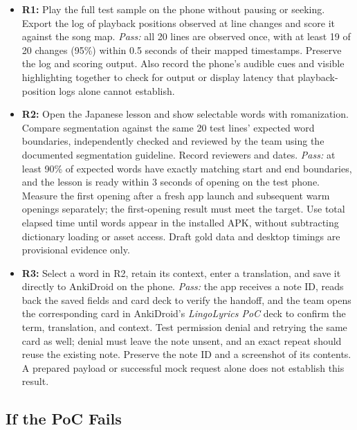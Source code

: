 \documentclass{article}
\begin{document}
\begin{itemize}
    \item \textbf{R1:} Play the full test sample on the phone without pausing
    or seeking. Export the log of playback positions observed at line changes
    and score it against the song map. \emph{Pass:} all 20 lines are observed
    once, with at least 19 of 20 changes (95\%) within 0.5 seconds of their
    mapped timestamps. Preserve the log and scoring output. Also record the
    phone's audible cues and visible highlighting together to check for output
    or display latency that playback-position logs alone cannot establish.
    \item \textbf{R2:} Open the Japanese lesson and show selectable words
    with romanization. Compare segmentation against the same 20 test lines'
    expected word boundaries, independently checked and reviewed by the team
    using the documented segmentation guideline. Record reviewers and dates.
    \emph{Pass:} at least 90\% of expected words have exactly matching start
    and end boundaries, and the lesson is ready within 3 seconds of opening
    on the test phone. Measure the first opening after a fresh app launch and
    subsequent warm openings separately; the first-opening result must meet
    the target. Use total elapsed time until words appear in the installed
    APK, without subtracting dictionary loading or asset access. Draft gold
    data and desktop timings are provisional evidence only.
    \item \textbf{R3:} Select a word in R2, retain its context, enter a
    translation, and save it directly to AnkiDroid on the phone.
    \emph{Pass:} the app receives a note ID, reads back the saved fields and
    card deck to verify the handoff, and the team opens the corresponding
    card in AnkiDroid's \emph{LingoLyrics PoC} deck to confirm the term,
    translation, and context. Test permission denial and retrying the same
    card as well; denial must leave the note unsent, and an exact repeat
    should reuse the existing note. Preserve the note ID and a
    screenshot of its contents. A prepared payload or successful mock request
    alone does not establish this result.
\end{itemize}

\subsection{If the PoC Fails}
\end{document}
